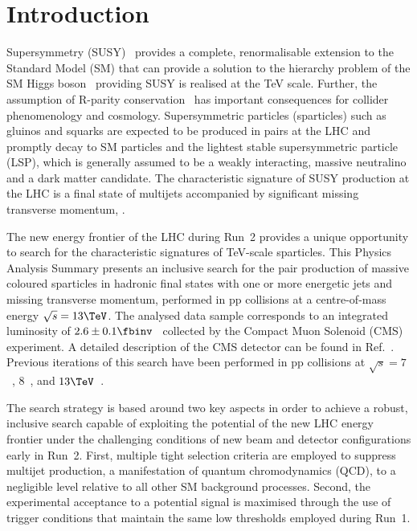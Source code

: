 \section{Introduction}
\label{sec:introduction}

Supersymmetry (SUSY)~\cite{ref:SUSY-1, ref:SUSY0, ref:SUSY1,
  ref:SUSY2, ref:SUSY3, ref:SUSY4, ref:hierarchy1, ref:hierarchy2}
provides a complete, renormalisable extension to the Standard Model
(SM) that can provide a solution to the hierarchy problem of the SM
Higgs boson~\cite{ref:atlashiggsdiscovery, ref:cmshiggsdiscovery}
providing SUSY is realised at the TeV scale. Further, the assumption
of R-parity conservation~\cite{Farrar:1978xj} has important
consequences for collider phenomenology and cosmology. Supersymmetric
particles (sparticles) such as gluinos and squarks are expected to be
produced in pairs at the LHC and promptly decay to SM particles and
the lightest stable supersymmetric particle (LSP), which is generally
assumed to be a weakly interacting, massive neutralino and a dark
matter candidate. The characteristic signature of SUSY production at
the LHC is a final state of multijets accompanied by significant
missing transverse momentum, \ptvecmiss.

The new energy frontier of the LHC during Run~2 provides a unique
opportunity to search for the characteristic signatures of TeV-scale
sparticles. This Physics Analysis Summary presents an inclusive search
for the pair production of massive coloured sparticles in hadronic
final states with one or more energetic jets and missing transverse
momentum, performed in pp collisions at a centre-of-mass energy
$\sqrt{s} = 13\TeV$. The analysed data sample corresponds to an
integrated luminosity of $2.6 \pm 0.1 \fbinv$~\cite{lumi} collected by
the Compact Muon Solenoid (CMS) experiment. A detailed description of
the CMS detector can be found in Ref.~\cite{ref:CMS}. Previous
iterations of this search have been performed in pp collisions at
$\sqrt{s} = 7$~\cite{RA1Paper, RA1Paper2011, RA1Paper2011FULL},
$8$~\cite{RA1Paper2012, RA1Parked}, and $13\TeV$~\cite{RA1Paper2015}.

The search strategy is based around two key aspects in order to
achieve a robust, inclusive search capable of exploiting the potential
of the new LHC energy frontier under the challenging conditions of new
beam and detector configurations early in Run~2. First, multiple tight
selection criteria are employed to suppress multijet production, a
manifestation of quantum chromodynamics (QCD), to a negligible level
relative to all other SM background processes. Second, the
experimental acceptance to a potential signal is maximised through the
use of trigger conditions that maintain the same low thresholds
employed during Run~1.

